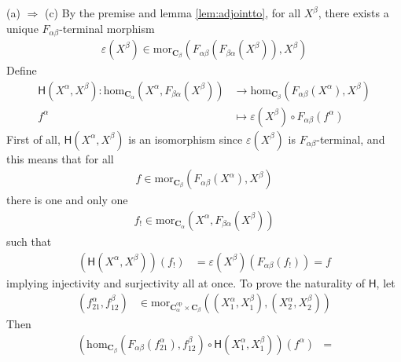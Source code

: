 \begin{prf}
{\glqq}(a) $\Rightarrow$ (c){\grqq}
\qquad
By the premise and lemma \ref{lem:adjointto}, for all $X^{\beta}$, there exists a unique $F_{\alpha\beta}$-terminal morphism
\begin{align*}
  \varepsilon(X^{\beta})
  \in
  \mathrm{mor}_{\mathbf{C}_{\beta}}
  \left(
    F_{\alpha\beta}
    \left(
      F_{\beta\alpha}(X^{\beta})
    \right),
    X^{\beta}
  \right)
\end{align*}
Define
\begin{align*}
  \mathsf{H}(X^{\alpha},X^{\beta})
  \colon
  \mathrm{hom}_{\mathbf{C}_{\alpha}}
  \left(
    X^{\alpha},
    F_{\beta\alpha}(X^{\beta})
  \right)
  &\rightarrow
  \mathrm{hom}_{\mathbf{C}_{\beta}}
  \left(
    F_{\alpha\beta}(X^{\alpha}),
    X^{\beta}
  \right)
  \\
  f^{\alpha}
  &\mapsto
  \varepsilon(X^{\beta})
  \circ
  F_{\alpha\beta}(f^{\alpha})
\end{align*}
First of all, $\mathsf{H}(X^{\alpha},X^{\beta})$ is an isomorphism since $\varepsilon(X^{\beta})$ is $F_{\alpha\beta}$-terminal, and this means that for all
\begin{align*}
  f
  \in
  \mathrm{mor}_{\mathbf{C}_{\beta}}
  \left(
    F_{\alpha\beta}(X^{\alpha}),
    X^{\beta}
  \right)
\end{align*}
there is one and only one
\begin{align*}
  f_{!}
  \in
  \mathrm{mor}_{\mathbf{C}_{\alpha}}
  \left(
    X^{\alpha},
    F_{\beta\alpha}(X^{\beta})
  \right)
\end{align*}
such that
\begin{align*}
  \left(
    \mathsf{H}(X^{\alpha},X^{\beta})
  \right)
  (f_{!})
  &=
  \varepsilon(X^{\beta})
  \left(
    F_{\alpha\beta}(f_{!})
  \right)
  =
  f
\end{align*}
implying injectivity and surjectivity all at once.
To prove the naturality of $\mathsf{H}$, let
\begin{align*}
  (f_{21}^{\alpha},f_{12}^{\beta})
  &\in
  \mathrm{mor}_{\mathbf{C}_{\alpha}^{\mathrm{op}} \times \mathbf{C}_{\beta}}
  \left(
    (X_{1}^{\alpha},X_{1}^{\beta}),
    (X_{2}^{\alpha},X_{2}^{\beta})
  \right)
\end{align*}
Then
\begin{align*}
  \left(
    \mathrm{hom}_{\mathbf{C}_{\beta}}
    \left(
      F_{\alpha\beta}(f_{21}^{\alpha}),
      f_{12}^{\beta}
    \right)
    \circ
    \mathsf{H}(X_{1}^{\alpha},X_{1}^{\beta})
  \right)
  (f^{\alpha})
  &=

\end{align*}
\end{prf}
